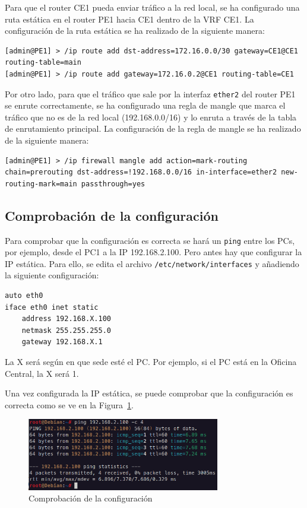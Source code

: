 Para que el router CE1 pueda enviar tráfico a la red local, se ha configurado una ruta estática en el router PE1 hacia CE1 dentro de la VRF CE1. La configuración de la ruta estática se ha realizado de la siguiente manera:
\begin{lstlisting}[language=RouterOS]
[admin@PE1] > /ip route add dst-address=172.16.0.0/30 gateway=CE1@CE1 routing-table=main
[admin@PE1] > /ip route add gateway=172.16.0.2@CE1 routing-table=CE1
\end{lstlisting}

Por otro lado, para que el tráfico que sale por la interfaz \texttt{ether2} del router PE1 se enrute correctamente, se ha configurado una regla de mangle que marca el tráfico que no es de la red local (192.168.0.0/16) y lo enruta a través de la tabla de enrutamiento principal. La configuración de la regla de mangle se ha realizado de la siguiente manera:
\begin{lstlisting}[language=RouterOS]
[admin@PE1] > /ip firewall mangle add action=mark-routing chain=prerouting dst-address=!192.168.0.0/16 in-interface=ether2 new-routing-mark=main passthrough=yes
\end{lstlisting}

\subsection{Comprobación de la configuración}
Para comprobar que la configuración es correcta se hará un \texttt{ping} entre los PCs, por ejemplo, desde el PC1 a la IP 192.168.2.100. Pero antes hay que configurar la IP estática. Para ello, se edita el archivo \texttt{/etc/network/interfaces} y añadiendo la siguiente configuración:
\begin{lstlisting}[language=bash]
auto eth0
iface eth0 inet static
	address 192.168.X.100
	netmask 255.255.255.0
	gateway 192.168.X.1
\end{lstlisting}

\begin{tcolorbox}[colback=gray!10!white, colframe=gray!70!black, title=NOTA:, size=title]
	La X será según en que sede esté el PC. Por ejemplo, si el PC está en la Oficina Central, la X será 1.
\end{tcolorbox}

Una vez configurada la IP estática, se puede comprobar que la configuración es correcta como se ve en la Figura~\ref{fig:ping_test}.
\begin{figure}[H]
	\centering
	\includegraphics[width=0.75\textwidth]{images/ping_test.png}
	\caption{Comprobación de la configuración}
	\label{fig:ping_test}
\end{figure}

